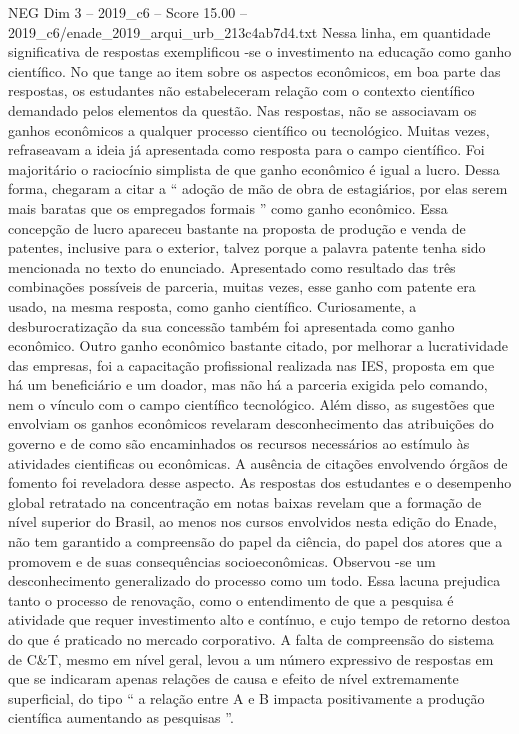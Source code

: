 \begin{textsample}{NEG Dim 3 – 2019\_c6 – Score 15.00 – 2019\_c6/enade\_2019\_arqui\_urb\_213c4ab7d4.txt}
Nessa linha, em quantidade significativa de respostas exemplificou -se o investimento na educação como ganho científico.
No que tange ao item sobre os aspectos econômicos, em boa parte das respostas, os estudantes não estabeleceram relação com o contexto científico demandado pelos elementos da questão.
Nas respostas, não se associavam os ganhos econômicos a qualquer processo científico ou tecnológico.
Muitas vezes, refraseavam a ideia já apresentada como resposta para o campo científico.
Foi majoritário o raciocínio simplista de que ganho econômico é igual a lucro.
Dessa forma, chegaram a citar a “ adoção de mão de obra de estagiários, por elas serem mais baratas que os empregados formais ” como ganho econômico.
Essa concepção de lucro apareceu bastante na proposta de produção e venda de patentes, inclusive para o exterior, talvez porque a palavra patente tenha sido mencionada no texto do enunciado.
Apresentado como resultado das três combinações possíveis de parceria, muitas vezes, esse ganho com patente era usado, na mesma resposta, como ganho científico.
Curiosamente, a desburocratização da sua concessão também foi apresentada como ganho econômico.
Outro ganho econômico bastante citado, por melhorar a lucratividade das empresas, foi a capacitação profissional realizada nas IES, proposta em que há um beneficiário e um doador, mas não há a parceria exigida pelo comando, nem o vínculo com o campo científico tecnológico.
Além disso, as sugestões que envolviam os ganhos econômicos revelaram desconhecimento das atribuições do governo e de como são encaminhados os recursos necessários ao estímulo às atividades cientificas ou econômicas.
A ausência de citações envolvendo órgãos de fomento foi reveladora desse aspecto.
As respostas dos estudantes e o desempenho global retratado na concentração em notas baixas revelam que a formação de nível superior do Brasil, ao menos nos cursos envolvidos nesta edição do Enade, não tem garantido a compreensão do papel da ciência, do papel dos atores que a promovem e de suas consequências socioeconômicas.
Observou -se um desconhecimento generalizado do processo como um todo.
Essa lacuna prejudica tanto o processo de renovação, como o entendimento de que a pesquisa é atividade que requer investimento alto e contínuo, e cujo tempo de retorno destoa do que é praticado no mercado corporativo.
A falta de compreensão do sistema de C\&T, mesmo em nível geral, levou a um número expressivo de respostas em que se indicaram apenas relações de causa e efeito de nível extremamente superficial, do tipo “ a relação entre A e B impacta positivamente a produção científica aumentando as pesquisas ”.

\end{textsample}
